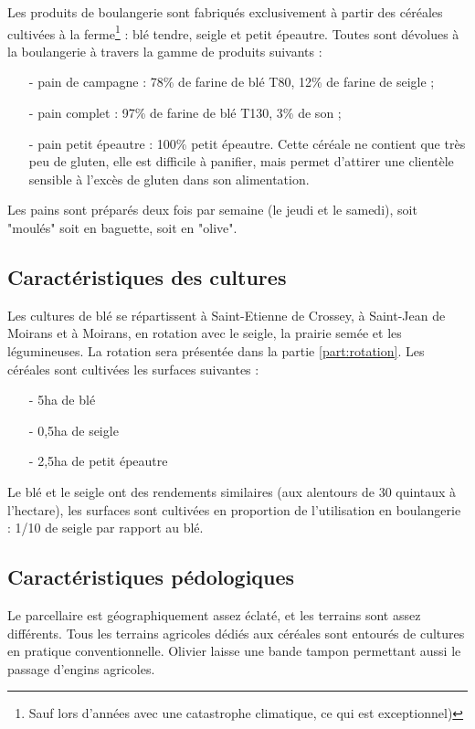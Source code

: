 \documentclass{article}
\begin{document}
Les produits de boulangerie sont fabriqués exclusivement à partir des céréales cultivées à la ferme\footnote{Sauf lors d'années avec une catastrophe climatique, ce qui est exceptionnel)} : blé tendre, seigle et petit épeautre. Toutes sont dévolues à la boulangerie à travers la gamme de produits suivants :
\begin{itemize}
	\item[-] pain de campagne : 78\% de farine de blé T80, 12\% de farine de seigle ;
	\item[-] pain complet : 97\% de farine de blé T130, 3\% de son ;
	\item[-] pain petit épeautre : 100\% petit épeautre. Cette céréale ne contient que très peu de gluten, elle est difficile à panifier, mais permet d'attirer une clientèle sensible à l'excès de gluten dans son alimentation.
\end{itemize}
Les pains sont préparés deux fois par semaine (le jeudi et le samedi), soit "moulés" soit en baguette, soit en "olive". 

\subsection{Caractéristiques des cultures}

Les cultures de blé se répartissent à Saint-Etienne de Crossey, à Saint-Jean de Moirans et à Moirans, en rotation avec le seigle, la prairie semée et les légumineuses. La rotation sera présentée dans la partie \ref{part:rotation}. Les céréales sont cultivées les surfaces suivantes :
\begin{itemize}
	\item[-] 5ha de blé
	\item[-] 0,5ha de seigle
	\item[-] 2,5ha de petit épeautre	
\end{itemize}
Le blé et le seigle ont des rendements similaires (aux alentours de 30 quintaux à l'hectare), les surfaces sont cultivées en proportion de l'utilisation en boulangerie : 1/10 de seigle par rapport au blé. 

\subsection{Caractéristiques pédologiques}

Le parcellaire est géographiquement assez éclaté, et les terrains sont assez différents. Tous les terrains agricoles dédiés aux céréales sont entourés de cultures en pratique conventionnelle. Olivier laisse une bande tampon permettant aussi le passage d'engins agricoles. 
\end{document}
